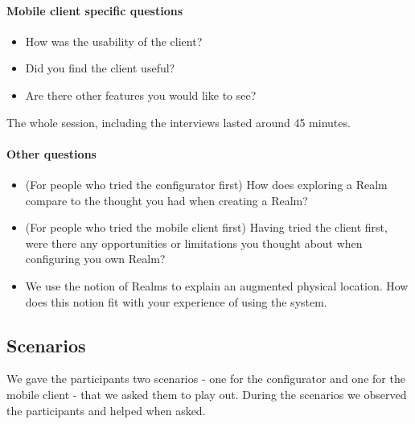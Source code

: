 \paragraph{Mobile client specific questions} %
\label{par:mobile_client_specific_questions}
\begin{itemize}
	\item How was the usability of the client?
	\item Did you find the client useful?
	\item Are there other features you would like to see?
\end{itemize}

The whole session, including the interviews lasted around 45 minutes.

\paragraph{Other questions} %
\label{par:other_questions}
\begin{itemize}
	\item (For people who tried the configurator first) How does exploring a Realm compare to the thought you had when creating a Realm?
	\item (For people who tried the mobile client first) Having tried the client first, were there any opportunities or limitations you thought about when configuring you own Realm?
	\item We use the notion of Realms to explain an augmented physical location. How does this notion fit with your experience of using the system.
\end{itemize}

\subsection{Scenarios} %
\label{sub:scenarios}
We gave the participants two scenarios - one for the configurator and one for the mobile client - that we asked them to play out. During the scenarios we observed the participants and helped when asked.

